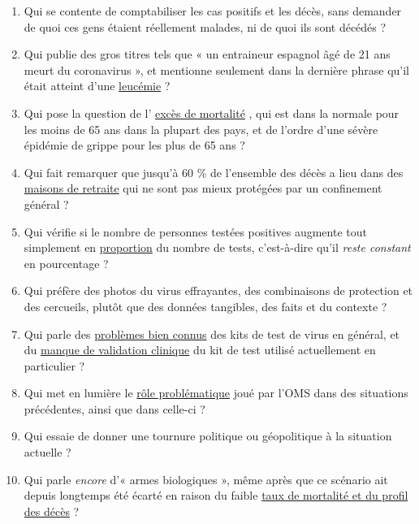 \begin{enumerate}
\def\labelenumi{\arabic{enumi}.}
\tightlist
\item
  Qui se contente de comptabiliser les cas positifs et les décès, sans
  demander de quoi ces gens étaient réellement malades, ni de quoi ils
  sont décédés ?
\item
  Qui publie des gros titres tels que « un entraineur espagnol âgé de 21
  ans meurt du coronavirus », et mentionne seulement dans la dernière
  phrase qu'il était atteint d'une
  \href{https://fr.sports.yahoo.com/news/coronavirus-d\%C3\%A9c\%C3\%A8s-dun-jeune-coach-093934930.html}{leucémie}
  ?
\item
  Qui pose la question de l'
  \href{https://www.euromomo.eu/index.html}{excès de mortalité} , qui
  est dans la normale pour les moins de 65 ans dans la plupart des pays,
  et de l'ordre d'une sévère épidémie de grippe pour les plus de 65 ans
  ?
\item
  Qui fait remarquer que jusqu'à 60 \% de l'ensemble des décès a lieu
  dans des
  \href{https://ltccovid.org/2020/04/12/mortality-associated-with-covid-19-outbreaks-in-care-homes-early-international-evidence/}{maisons
  de retraite} qui ne sont pas mieux protégées par un confinement
  général ?
\item
  Qui vérifie si le nombre de personnes testées positives augmente tout
  simplement en
  \href{https://multipolar-magazin.de/artikel/coronavirus-irrefuhrung-fallzahlen}{proportion}
  du nombre de tests, c'est-à-dire qu'il \emph{reste constant} en
  pourcentage ?
\item
  Qui préfère des photos du virus effrayantes, des combinaisons de
  protection et des cercueils, plutôt que des données tangibles, des
  faits et du contexte ?
\item
  Qui parle des
  \href{https://www.ncbi.nlm.nih.gov/pmc/articles/PMC2095096/}{problèmes
  bien connus} des kits de test de virus en général, et du
  \href{https://www.creative-diagnostics.com/sars-cov-2-coronavirus-multiplex-rt-qpcr-kit-277854-457.htm}{manque
  de validation clinique} du kit de test utilisé actuellement en
  particulier ?
\item
  Qui met en lumière le
  \href{https://www.forbes.com/2010/02/05/world-health-organization-swine-flu-pandemic-opinions-contributors-michael-fumento.html\#208eef4048e8}{rôle
  problématique} joué par l'OMS dans des situations précédentes, ainsi
  que dans celle-ci ?
\item
  Qui essaie de donner une tournure politique ou géopolitique à la
  situation actuelle ?
\item
  Qui parle \emph{encore} d'« armes biologiques », même après que ce
  scénario ait depuis longtemps été écarté en raison du faible
  \href{https://www.statnews.com/2020/03/17/a-fiasco-in-the-making-as-the-coronavirus-pandemic-takes-hold-we-are-making-decisions-without-reliable-data/}{taux
  de mortalité et du profil des décès} ?
\end{enumerate}

